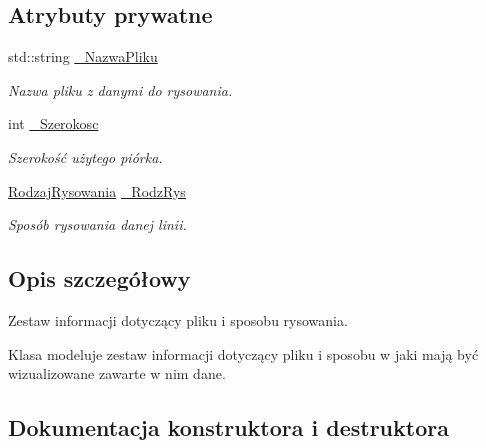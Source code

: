 \subsection*{Atrybuty prywatne}
\begin{DoxyCompactItemize}
\item 
std\+::string \hyperlink{classPzG_1_1InfoPlikuDoRysowania_a07ab06c56b9c3179e566a4123ab2a037}{\+\_\+\+Nazwa\+Pliku}
\begin{DoxyCompactList}\small\item\em Nazwa pliku z danymi do rysowania. \end{DoxyCompactList}\item 
int \hyperlink{classPzG_1_1InfoPlikuDoRysowania_a56a03dde7a7a414dbf3c230812a8d741}{\+\_\+\+Szerokosc}
\begin{DoxyCompactList}\small\item\em Szerokość użytego piórka. \end{DoxyCompactList}\item 
\hyperlink{namespacePzG_a705c92106f39b7d0c34a6739d10ff0b6}{Rodzaj\+Rysowania} \hyperlink{classPzG_1_1InfoPlikuDoRysowania_ac2512f2073c66164beb2e88db31344a4}{\+\_\+\+Rodz\+Rys}
\begin{DoxyCompactList}\small\item\em Sposób rysowania danej linii. \end{DoxyCompactList}\end{DoxyCompactItemize}


\subsection{Opis szczegółowy}
Zestaw informacji dotyczący pliku i sposobu rysowania. 

Klasa modeluje zestaw informacji dotyczący pliku i sposobu w jaki mają być wizualizowane zawarte w nim dane. 

\subsection{Dokumentacja konstruktora i destruktora}
\mbox{\label{classPzG_1_1InfoPlikuDoRysowania_a48bc8ad94ef5fd5120b668a566c9172e}} 
